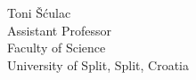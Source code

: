 \begin{singlespace}
    \vspace{0.1in}
    
    Toni Šćulac \\
    \null\quad\quad Assistant Professor \\
    \null\quad\quad Faculty of Science \\
    \null\quad\quad University of Split, Split, Croatia 
    
    
    
    



\end{singlespace}